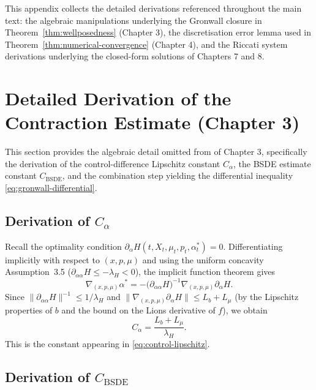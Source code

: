
This appendix collects the detailed derivations referenced throughout the main
text: the algebraic manipulations underlying the Gronwall closure in Theorem~\ref{thm:wellposedness}
(Chapter 3), the discretisation error lemma used in Theorem~\ref{thm:numerical-convergence} (Chapter 4), and
the Riccati system derivations underlying the closed-form solutions of Chapters 7
and 8.


\section{Detailed Derivation of the Contraction Estimate (Chapter 3)}
\label{sec:appA-contraction}

This section provides the algebraic detail omitted from  of
Chapter 3, specifically the derivation of the control-difference Lipschitz constant
$C_\alpha$, the BSDE estimate constant $C_{\mathrm{BSDE}}$, and the combination
step yielding the differential inequality \eqref{eq:gronwall-differential}.

\subsection{Derivation of $C_\alpha$}

Recall the optimality condition $\partial_\alpha H(t,X_t,\mu_t,p_t,\alpha_t^*) = 0$.
Differentiating implicitly with respect to $(x, p, \mu)$ and using the uniform
concavity Assumption~3.5 ($\partial_{\alpha\alpha} H \leq -\lambda_H < 0$), the
implicit function theorem gives
\[
    \nabla_{(x,p,\mu)} \alpha^* = -\big(\partial_{\alpha\alpha} H\big)^{-1}
    \nabla_{(x,p,\mu)} \partial_\alpha H.
\]
Since $\|\partial_{\alpha\alpha} H\|^{-1} \leq 1/\lambda_H$ and
$\|\nabla_{(x,p,\mu)} \partial_\alpha H\| \leq L_b + L_\mu$ (by the Lipschitz
properties of $b$ and the bound on the Lions derivative of $f$), we obtain
\[
    C_\alpha = \frac{L_b + L_\mu}{\lambda_H}.
\]
This is the constant appearing in \eqref{eq:control-lipschitz}.

\subsection{Derivation of $C_{\mathrm{BSDE}}$}

